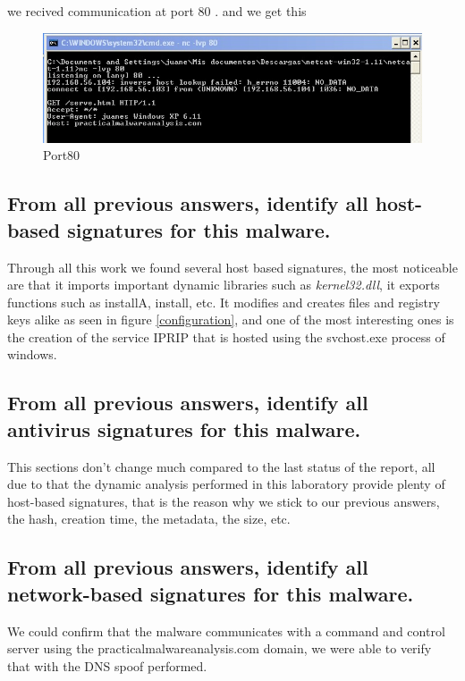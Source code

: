\documentclass[12pt,letter]{article} %
\begin{document}
            we recived communication at port $ 80  $ . and we get this
            \begin{figure}[h!]
                \centering
                \includegraphics[width=0.6\linewidth]{port80.jpeg}
                \caption{Port80}
                \label{fig:port80}
            \end{figure}

        \subsection{From all previous answers, identify all host-based
        signatures for this malware.}
			Through all this work we found several host based signatures, the most noticeable are that it imports important dynamic libraries such as \textit{kernel32.dll}, it exports functions such as installA, install, etc. It modifies and creates files and registry keys alike as seen in figure \ref{configuration}, and one of the most interesting ones is the creation of the service IPRIP that is hosted using the svchost.exe process of windows.
        \subsection{From all previous answers, identify all antivirus
        signatures for this malware. }
			This sections don't change much compared to the last status of the report, all due to that the dynamic analysis performed in this laboratory provide plenty of host-based signatures, that is the reason why we stick to our previous answers, the hash, creation time, the metadata, the size, etc.
        \subsection{From all previous answers, identify all network-based
        signatures for this malware.}
		We could confirm that the malware communicates with a command and control server using the practicalmalwareanalysis.com domain, we were able to verify that with the DNS spoof performed.
\end{document}
